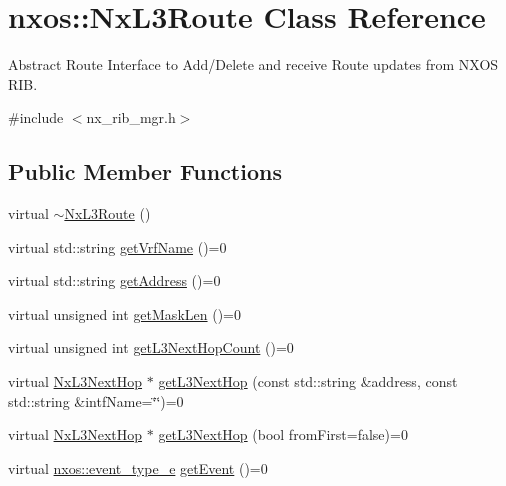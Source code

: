 \hypertarget{classnxos_1_1_nx_l3_route}{}\section{nxos\+:\+:Nx\+L3\+Route Class Reference}
\label{classnxos_1_1_nx_l3_route}


Abstract Route Interface to Add/\+Delete and receive Route updates from N\+X\+OS R\+IB.  




{\ttfamily \#include $<$nx\+\_\+rib\+\_\+mgr.\+h$>$}

\subsection*{Public Member Functions}
\begin{DoxyCompactItemize}
\item 
virtual \mbox{\hyperlink{classnxos_1_1_nx_l3_route_abb3762fb6629ba1900e877555cbb69dc}{$\sim$\+Nx\+L3\+Route}} ()
\item 
virtual std\+::string \mbox{\hyperlink{classnxos_1_1_nx_l3_route_a06ed660337e8b919dd801267957497d7}{get\+Vrf\+Name}} ()=0
\item 
virtual std\+::string \mbox{\hyperlink{classnxos_1_1_nx_l3_route_a3176245539589bf745ce1d196975b3c9}{get\+Address}} ()=0
\item 
virtual unsigned int \mbox{\hyperlink{classnxos_1_1_nx_l3_route_aaafa1d34e62297bbed574995ff48dba9}{get\+Mask\+Len}} ()=0
\item 
virtual unsigned int \mbox{\hyperlink{classnxos_1_1_nx_l3_route_a5e402096d7ff280b6f4d334b3bd954d4}{get\+L3\+Next\+Hop\+Count}} ()=0
\item 
virtual \mbox{\hyperlink{classnxos_1_1_nx_l3_next_hop}{Nx\+L3\+Next\+Hop}} $\ast$ \mbox{\hyperlink{classnxos_1_1_nx_l3_route_a79bd39e19c238b12f0af22d2781059cd}{get\+L3\+Next\+Hop}} (const std\+::string \&address, const std\+::string \&intf\+Name=\char`\"{}\char`\"{})=0
\item 
virtual \mbox{\hyperlink{classnxos_1_1_nx_l3_next_hop}{Nx\+L3\+Next\+Hop}} $\ast$ \mbox{\hyperlink{classnxos_1_1_nx_l3_route_a7877c5328b1706acbbe5d8dbc6c94f4e}{get\+L3\+Next\+Hop}} (bool from\+First=false)=0
\item 
virtual \mbox{\hyperlink{nx__common_8h_af9a9040b7681199d386e94eb888018cb}{nxos\+::event\+\_\+type\+\_\+e}} \mbox{\hyperlink{classnxos_1_1_nx_l3_route_a9ca0b236a35cc616753e09e620b6b02f}{get\+Event}} ()=0
\item 

\end{DoxyCompactItemize}
